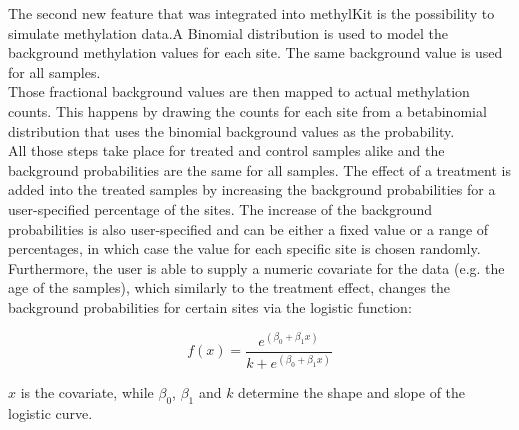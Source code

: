 The second new feature that was integrated into methylKit is the possibility to simulate methylation data.A Binomial distribution is used to model the background methylation values for each site. The same background value is used for all samples.\\
Those fractional background values are then mapped to actual methylation counts. This happens by drawing the counts for each site from a betabinomial distribution that uses the binomial background values as the probability.\\
All those steps take place for treated and control samples alike and the background probabilities are the same for all samples.
The effect of a treatment is added into the treated samples by increasing the background probabilities for a user-specified percentage of the sites. The increase of the background probabilities is also user-specified and can be either a fixed value or a range of percentages, in which case the value for each specific site is chosen randomly.\\
Furthermore, the user is able to supply a numeric covariate for the data (e.g. the age of the samples), which similarly to the treatment effect, changes the background probabilities for certain sites via the logistic function:

\[f(x) = \frac{e^{(\beta_{0} + \beta_{1}x)}}{k+e^{(\beta_{0} + \beta_{1}x)}}\]

$x$ is the covariate, while $\beta_{0}$, $\beta_{1}$ and $k$ determine the shape and slope of the logistic curve.
  
  
  
  
  
  